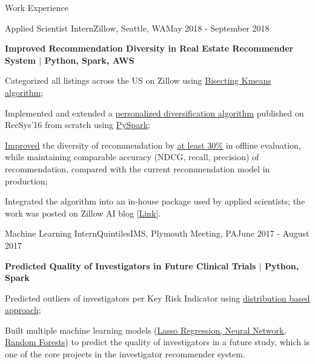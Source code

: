 \documentclass{my_resume} %
\begin{document}
\begin{rSection}{Work Experience}

  \begin{rSubsection}{Applied Scientist Intern}{Zillow, Seattle,
    WA}{May 2018 - September 2018}

  \item[] \textbf{Improved Recommendation Diversity in Real Estate Recommender
      System
    $|$ Python, Spark, AWS}
  \item Categorized all listings across the US on Zillow using  
    \underline{Bisecting Kmeans algorithm};
  \item Implemented and extended a \underline{personalized diversification algorithm}
    published on RecSys'16 from scratch using \underline{PySpark};
  \item \underline{Improved} the diversity of recommendation by \underline{at
    least 30\%} in offline evaluation, while maintaining comparable accuracy
    (NDCG, recall, precision) of recommendation, compared with the current
    recommendation model in production;
  \item Integrated the algorithm into an in-house package used by applied
    scientists; the work was posted on Zillow AI blog
    [\href{https://www.zillow.com/data-science/personalized-recommendation-diversity/}{Link}].
  \end{rSubsection}

  \begin{rSubsection}{Machine Learning Intern}{QuintilesIMS, Plymouth Meeting,
    PA}{June 2017 - August 2017}

  \item[] \textbf{Predicted Quality of Investigators in Future Clinical Trials
    $|$ Python, Spark}
  \item Predicted outliers of investigators per Key Risk Indicator using
    \underline{distribution based approach};
  \item Built multiple machine learning models (\underline{Lasso Regression, Neural
    Network, Random Forests}) to predict the quality of investigators in a
    future study, which is one of the core projects in the investigator
    recommender system.
  \end{rSubsection}


\end{rSection}
\end{document}

